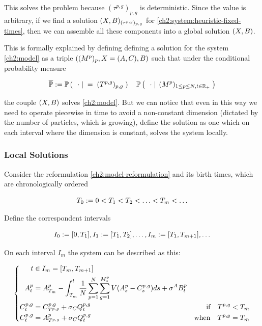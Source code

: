 This solves the problem because $(\tau^{p,g})_{p,g}$ is deterministic.
Since the value is arbitrary, if we find a solution $(X, B)_{(\tau^{p,g})_{p,g}}$ for \ref{ch2:system:heuristic-fixed-times}, then we can assemble all these components into a global solution $(X, B)$.

This is formally explained by defining defining a solution for the system \ref{ch2:model} as a triple $((M^p)_p, X = (A, C), B)$ such that under the conditional probability measure

\begin{equation}
\overline{\mathbb{P}} : = \mathbb{P} \left( \; \left. \; \cdot \; \right| \; =\;(T^{p,g})_{p,g}  \; \right) \quad\mathbb{P} \left( \; \left. \; \cdot \; \right| \; (M^p)_{1\leq p\leq N, t\in\mathbb{R}_+}  \; \right)
\end{equation}

the couple $(X,B)$ solves \ref{ch2:model}.
But we can notice that even in this way we need to operate piecewise in time to avoid a non-constant dimension (dictated by the number of particles, which is growing), \ie define the solution as one which on each interval where the dimension is constant, solves the system locally.

\subsubsection{Local Solutions}

Consider the reformulation \ref{ch2:model-reformulation} and its birth times, which are chronologically ordered

\begin{equation}
T_0:=0 < T_1 < T_2 < \ldots < T_m < \ldots
\end{equation}

Define the correspondent intervals

\begin{equation}
I_0 := [0,T_1], I_1:=[T_1,T_2], \ldots , I_m:= [T_1,T_{m+1}],\ldots
\end{equation}

On each interval $I_m$ the system can be described as this:

\begin{equation}
\left\{
\begin{aligned}
t &\in I_m = [T_m,T_{m+1}]
&
\\
A_t^p 
&= A_{T_m}^p 
- \int_{T_m}^t 
	\frac{1}{N} \sum _{p = 1}^{N} \sum_{g = 1}^{M_s^p} V(A_s^p - C_s^{p,g})
d s + \sigma^A B_t^p
&
\\
C_t^{p,g} 
&= C_{T^{p,g}}^{p,g} + \sigma_C Q_t^{p,g}
&\text{if} \quad T^{p,g} < T_m
\\
C_t^{p,g}
&= A_{T^{p,g}}^p + \sigma_C Q_t^{p,g}
&\text{when} \quad T^{p,g} = T_m
\end{aligned}
\right.
\end{equation}\label{ch2:system:local-model}

